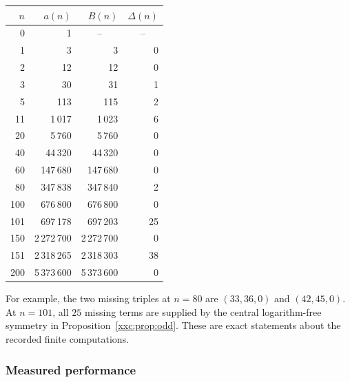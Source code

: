 \documentclass[11pt,a4paper]{article}
\numberwithin{equation}{section}
\theoremstyle{definition}
\theoremstyle{remark}
\theoremstyle{plain}
\begin{document}
\begin{center}
\begin{tabular}{rrrr}
\toprule
$n$ & $a(n)$ & $B(n)$ & $\Delta(n)$\\
\midrule
0 & 1 & \multicolumn{1}{c}{--} & \multicolumn{1}{c}{--}\\
1 & 3 & 3 & 0\\
2 & 12 & 12 & 0\\
3 & 30 & 31 & 1\\
5 & 113 & 115 & 2\\
11 & 1\,017 & 1\,023 & 6\\
20 & 5\,760 & 5\,760 & 0\\
40 & 44\,320 & 44\,320 & 0\\
60 & 147\,680 & 147\,680 & 0\\
80 & 347\,838 & 347\,840 & 2\\
100 & 676\,800 & 676\,800 & 0\\
101 & 697\,178 & 697\,203 & 25\\
150 & 2\,272\,700 & 2\,272\,700 & 0\\
151 & 2\,318\,265 & 2\,318\,303 & 38\\
200 & 5\,373\,600 & 5\,373\,600 & 0\\
\bottomrule
\end{tabular}
\end{center}
For example, the two missing triples at $n=80$ are
$(33,36,0)$ and $(42,45,0)$. At $n=101$, all $25$ missing terms are supplied
by the central logarithm-free symmetry in Proposition~\ref{xxc:prop:odd}.
These are exact statements about the recorded finite computations.

\subsubsection{Measured performance}
\end{document}
